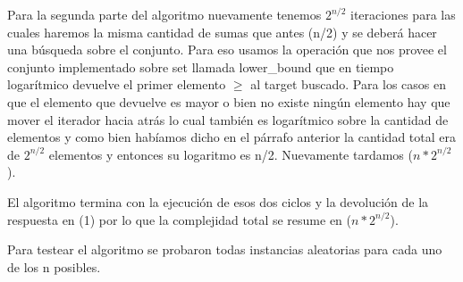 Para la segunda parte del algoritmo nuevamente tenemos $2 ^{n/2}$ iteraciones para las cuales haremos la misma cantidad de sumas que antes (n/2) y se deberá hacer una búsqueda sobre el conjunto. Para eso usamos la operación que nos provee el conjunto implementado sobre set llamada lower_bound que en tiempo logarítmico devuelve el primer elemento $\geq$ al target buscado. Para los casos en que el elemento que devuelve es mayor o bien no existe ningún elemento hay que mover el iterador hacia atrás lo cual también es logarítmico sobre la cantidad de elementos y como bien habíamos dicho en el párrafo anterior la cantidad total era de $2 ^{n/2}$ elementos y entonces su logaritmo es n/2. Nuevamente tardamos \bigo($n * 2 ^{n/2}$).

El algoritmo termina con la ejecución de esos dos ciclos y la devolución de la respuesta en \bigo(1) por lo que la complejidad total se resume en \bigo($n * 2 ^{n/2}$).

Para testear el algoritmo se probaron todas instancias aleatorias para cada uno de los n posibles.
